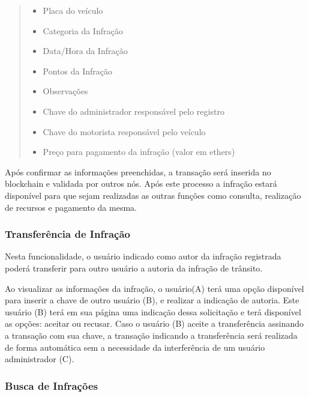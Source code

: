         \begin{quote}
        
            \begin{itemize}
                \item Placa do veículo
                \item Categoria da Infração
                \item Data/Hora da Infração
                \item Pontos da Infração
                \item Observações
                \item Chave do administrador responsável pelo registro
                \item Chave do motorista responsável pelo veículo
                \item Preço para pagamento da infração (valor em ethers)
            \end{itemize}
            
        \end{quote}
        
        Após confirmar as informações preenchidas, a transação será inserida no blockchain e validada por outros nós. Após este processo a infração estará disponível para que sejam realizadas as outras funções como consulta, realização de recursos e pagamento da mesma.
        
            
    \subsubsection{Transferência de Infração}
    
        Nesta funcionalidade, o usuário indicado como autor da infração registrada poderá transferir para outro usuário a autoria da infração de trânsito.
        
        Ao visualizar as informações da infração, o usuário(A) terá uma opção disponível para inserir a chave de outro usuário (B), e realizar a indicação de autoria. Este usuário (B) terá em sua página uma indicação dessa solicitação e terá disponível as opções: aceitar ou recusar. Caso o usuário (B) aceite a transferência assinando a transação com sua chave, a transação indicando a transferência será realizada de forma automática sem a necessidade da interferência de um usuário administrador (C).
    
    \subsubsection{Busca de Infrações}
    
